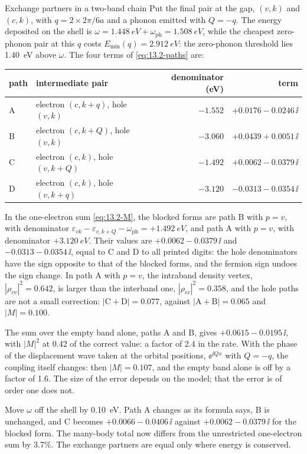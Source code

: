 \begin{workedexample}{Exchange partners in a two-band chain}
Put the final pair at the gap, $(v,k)$ and $(c,k)$, with $q = 2\times2\pi/6a$ and a phonon emitted with $Q = -q$. The energy deposited on the shell is $\omega = \SI{1.448}{eV} + \omega_{\mathrm{ph}} = \SI{1.508}{eV}$, while the cheapest zero-phonon pair at this $q$ costs $E_{\mathrm{min}}(q) = \SI{2.912}{eV}$: the zero-phonon threshold lies \SI{1.40}{eV} above $\omega$. The four terms of \cref{eq:13.2-paths} are:
\begin{center}
\small
\begin{tabular}{llrr}
  \toprule
  path & intermediate pair & denominator (eV) & term \\
  \midrule
  A & electron $(c,k+q)$, hole $(v,k)$ & $-1.552$ & $+0.0176 - 0.0246\,\ii$ \\
  B & electron $(c,k+Q)$, hole $(v,k)$ & $-3.060$ & $+0.0439 + 0.0051\,\ii$ \\
  C & electron $(c,k)$, hole $(v,k+Q)$ & $-1.492$ & $+0.0062 - 0.0379\,\ii$ \\
  D & electron $(c,k)$, hole $(v,k+q)$ & $-3.120$ & $-0.0313 - 0.0354\,\ii$ \\
  \bottomrule
\end{tabular}
\end{center}
In the one-electron sum \cref{eq:13.2-M}, the blocked forms are path B with $p = v$, with denominator $\varepsilon_{v k} - \varepsilon_{v,k+Q} - \omega_{\mathrm{ph}} = +\SI{1.492}{eV}$, and path A with $p = v$, with denominator $+\SI{3.120}{eV}$. Their values are $+0.0062 - 0.0379\,\ii$ and $-0.0313 - 0.0354\,\ii$, equal to C and D to all printed digits: the hole denominators have the sign opposite to that of the blocked forms, and the fermion sign undoes the sign change. In path A with $p = v$, the intraband density vertex, $|\rho_{vv}|^2 = 0.642$, is larger than the interband one, $|\rho_{cv}|^2 = 0.358$, and the hole paths are not a small correction: $|\mathrm{C} + \mathrm{D}| = 0.077$, against $|\mathrm{A} + \mathrm{B}| = 0.065$ and $|M| = 0.100$.

The sum over the empty band alone, paths A and B, gives $+0.0615 - 0.0195\,\ii$, with $|M|^2$ at 0.42 of the correct value: a factor of 2.4 in the rate. With the phase of the displacement wave taken at the orbital positions, $\ee^{\ii Qx}$ with $Q = -q$, the coupling itself changes: then $|M| = 0.107$, and the empty band alone is off by a factor of 1.6. The size of the error depends on the model; that the error is of order one does not.

Move $\omega$ off the shell by \SI{0.10}{eV}. Path A changes as its formula says, B is unchanged, and C becomes $+0.0066 - 0.0406\,\ii$ against $+0.0062 - 0.0379\,\ii$ for the blocked form. The many-body total now differs from the unrestricted one-electron sum by 3.7\%. The exchange partners are equal only where energy is conserved.
\end{workedexample}

